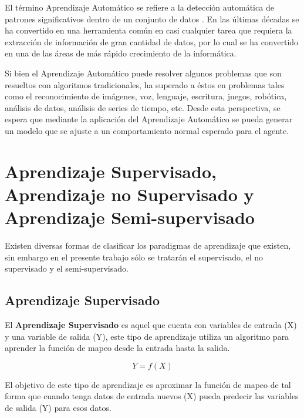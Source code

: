 El t\'{e}rmino Aprendizaje Autom\'{a}tico se refiere a la detecci\'{o}n autom\'{a}tica de patrones significativos dentro de un conjunto de datos \cite{32}. En las \'{u}ltimas d\'{e}cadas se ha convertido en una herramienta com\'{u}n en casi cualquier tarea que requiera la extracci\'{o}n de informaci\'{o}n de gran cantidad de datos, por lo cual se ha convertido en una de las \'{a}reas de m\'{a}s r\'{a}pido crecimiento de la inform\'{a}tica.

\vspace{5mm} %

Si bien el Aprendizaje Autom\'{a}tico puede resolver algunos problemas que son resueltos con algoritmos tradicionales, ha superado a \'{e}stos en problemas tales como el reconocimiento de im\'{a}genes, voz, lenguaje, escritura, juegos, rob\'{o}tica, an\'{a}lisis de datos, an\'{a}lisis de series de tiempo, etc. Desde esta perspectiva, se espera que mediante la aplicaci\'{o}n del Aprendizaje Autom\'{a}tico se pueda generar un modelo que se ajuste a un comportamiento normal esperado para el agente.

\section{Aprendizaje Supervisado, Aprendizaje no Supervisado y Aprendizaje Semi-supervisado}
\label{section|aprendizaje}

Existen diversas formas de clasificar los paradigmas de aprendizaje que existen, sin embargo en el presente trabajo s\'{o}lo se tratar\'{a}n el supervisado, el no supervisado y el semi-supervisado.

\subsection{Aprendizaje Supervisado}

El \textbf{Aprendizaje Supervisado} es aquel que cuenta con variables de entrada (X) y una variable de salida (Y), este tipo de aprendizaje utiliza un algoritmo para aprender la funci\'{o}n de mapeo desde la entrada hasta la salida.

\begin{equation}
Y = f(X)
\end{equation}

El objetivo de este tipo de aprendizaje es aproximar la funci\'{o}n de mapeo de tal forma que cuando tenga datos de entrada nuevos (X) pueda predecir las variables de salida (Y) para esos datos. 

